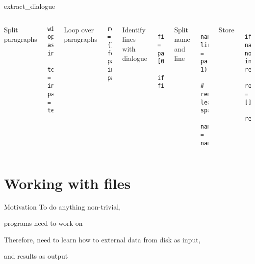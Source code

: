 \documentclass[aspectratio=169,usenames,dvipsnames]{beamer}
\begin{document}

\begin{frame}[fragile]{extract\_dialogue}
\begin{columns}
Split paragraphs
\begin{lstlisting}
with open(filename) as infile:
    text = infile.read()
paragraphs = text.split('\n\n')
\end{lstlisting}
\pause
Loop over paragraphs
\begin{lstlisting}
result = {}
for para in paragraphs:
\end{lstlisting}

\pause
Identify lines with dialogue
\begin{lstlisting}
    first_token = para.split()[0]
    if first_token.endswith('.'):
\end{lstlisting}
\pause Split name and line
\begin{lstlisting}
        name, line = para.split('.', 1)
        # remove leading/trailing spaces
        name = name.strip()
\end{lstlisting}
Store
\begin{lstlisting}
        if name not in result:
            result[name] = []
        result[name].append(line)
\end{lstlisting}
\end{columns}
\end{frame}





\section{Working with files}
\frame{\tableofcontents[currentsection]}

\begin{frame}{Motivation}
    To do anything non-trivial,

    programs need to work on 

    \pause
    Therefore, need to learn how to  external data
	from disk as input,

    and  results as output

\end{frame}
\end{document}

